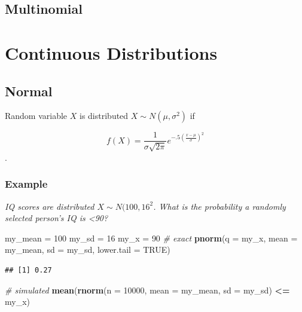 \documentclass[
]{book}
\newenvironment{Shaded}{\begin{snugshade}}{\end{snugshade}}
\newcommand{\CommentTok}[1]{\textcolor[rgb]{0.56,0.35,0.01}{\textit{#1}}}
\newcommand{\DataTypeTok}[1]{\textcolor[rgb]{0.13,0.29,0.53}{#1}}
\newcommand{\DecValTok}[1]{\textcolor[rgb]{0.00,0.00,0.81}{#1}}
\newcommand{\KeywordTok}[1]{\textcolor[rgb]{0.13,0.29,0.53}{\textbf{#1}}}
\newcommand{\NormalTok}[1]{#1}
\newcommand{\OperatorTok}[1]{\textcolor[rgb]{0.81,0.36,0.00}{\textbf{#1}}}
\newcommand{\OtherTok}[1]{\textcolor[rgb]{0.56,0.35,0.01}{#1}}
\newcommand{\StringTok}[1]{\textcolor[rgb]{0.31,0.60,0.02}{#1}}
\begin{document}
\hypertarget{multinomial}{%
\subsection{Multinomial}\label{multinomial}}

\hypertarget{continuous-distributions}{%
\section{Continuous Distributions}\label{continuous-distributions}}

\hypertarget{normal}{%
\subsection{Normal}\label{normal}}

Random variable \(X\) is distributed \(X \sim N(\mu, \sigma^2)\) if

\[f(X)=\frac{{1}}{{\sigma \sqrt{{2\pi}}}}e^{-.5(\frac{{x-\mu}}{{\sigma}})^2}\].

\hypertarget{example-10}{%
\subsubsection*{Example}\label{example-10}}

\emph{IQ scores are distributed \(X \sim N(100, 16^2\). What is the probability a randomly selected person's IQ is \textless90?}

\begin{Shaded}
\begin{Highlighting}[]
\NormalTok{my_mean =}\StringTok{ }\DecValTok{100}
\NormalTok{my_sd =}\StringTok{ }\DecValTok{16}
\NormalTok{my_x =}\StringTok{ }\DecValTok{90}
\CommentTok{# exact}
\KeywordTok{pnorm}\NormalTok{(}\DataTypeTok{q =}\NormalTok{ my_x, }\DataTypeTok{mean =}\NormalTok{ my_mean, }\DataTypeTok{sd =}\NormalTok{ my_sd, }\DataTypeTok{lower.tail =} \OtherTok{TRUE}\NormalTok{)}
\end{Highlighting}
\end{Shaded}

\begin{verbatim}
## [1] 0.27
\end{verbatim}

\begin{Shaded}
\begin{Highlighting}[]
\CommentTok{# simulated}
\KeywordTok{mean}\NormalTok{(}\KeywordTok{rnorm}\NormalTok{(}\DataTypeTok{n =} \DecValTok{10000}\NormalTok{, }\DataTypeTok{mean =}\NormalTok{ my_mean, }\DataTypeTok{sd =}\NormalTok{ my_sd) }\OperatorTok{<=}\StringTok{ }\NormalTok{my_x)}
\end{Highlighting}
\end{Shaded}
\end{document}
